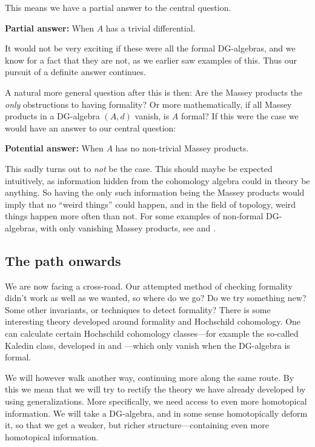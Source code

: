 This means we have a partial answer to the central question.

\textbf{Partial answer:} When $A$ has a trivial differential. 

It would not be very exciting if these were all the formal DG-algebras, and we know for a fact that they are not, as we earlier saw examples of this. Thus our pursuit of a definite answer continues. 

A natural more general question after this is then: Are the Massey products the \emph{only} obstructions to having formality? Or more mathematically, if all Massey products in a DG-algebra $(A,d)$ vanish, is $A$ formal? If this were the case we would have an answer to our central question:

\textbf{Potential answer:} When $A$ has no non-trivial Massey products.

This sadly turns out to \emph{not} be the case. This should maybe be expected intuitively, as information hidden from the cohomology algebra could in theory be anything. So having the only such information being the Massey products would imply that no ``weird things'' could happen, and in the field of topology, weird things happen more often than not. For some examples of non-formal DG-algebras, with only vanishing Massey products, see \cite[Section 1.5]{non_formal1} and \cite[Example 8.13.]{non_formal2}. 

\subsection*{The path onwards}

We are now facing a cross-road. Our attempted method of checking formality didn't work as well as we wanted, so where do we go? Do we try something new? Some other invariants, or techniques to detect formality? There is some interesting theory developed around formality and Hochschild cohomology. One can calculate certain Hochschild cohomology classes---for example the so-called Kaledin class, developed in \cite{kaledin1} and \cite{kaledin2}---which only vanish when the DG-algebra is formal. 

We will however walk another way, continuing more along the same route. By this we mean that we will try to rectify the theory we have already developed by using generalizations. More specifically, we need access to even more homotopical information. We will take a DG-algebra, and in some sense homotopically deform it, so that we get a weaker, but richer structure---containing even more homotopical information. 





